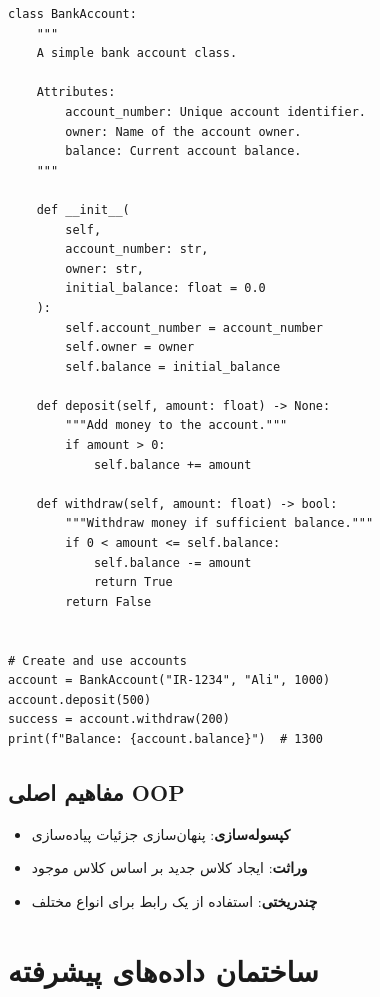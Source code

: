 \documentclass{matinbook}
\begin{document}
\begin{latin}
\begin{verbatim}
class BankAccount:
    """
    A simple bank account class.
    
    Attributes:
        account_number: Unique account identifier.
        owner: Name of the account owner.
        balance: Current account balance.
    """
    
    def __init__(
        self,
        account_number: str,
        owner: str,
        initial_balance: float = 0.0
    ):
        self.account_number = account_number
        self.owner = owner
        self.balance = initial_balance
    
    def deposit(self, amount: float) -> None:
        """Add money to the account."""
        if amount > 0:
            self.balance += amount
    
    def withdraw(self, amount: float) -> bool:
        """Withdraw money if sufficient balance."""
        if 0 < amount <= self.balance:
            self.balance -= amount
            return True
        return False


# Create and use accounts
account = BankAccount("IR-1234", "Ali", 1000)
account.deposit(500)
success = account.withdraw(200)
print(f"Balance: {account.balance}")  # 1300
\end{verbatim}
\end{latin}
\label{code:bank-account}

\section{مفاهیم اصلی OOP}

\begin{itemize}
    \item \textbf{کپسوله‌سازی}:
    پنهان‌سازی جزئیات پیاده‌سازی
    \item \textbf{وراثت}:
    ایجاد کلاس جدید بر اساس کلاس موجود
    \item \textbf{چندریختی}:
    استفاده از یک رابط برای انواع مختلف
\end{itemize}

\chapter{ساختمان داده‌های پیشرفته}
\label{chap:data-structures}
\end{document}
